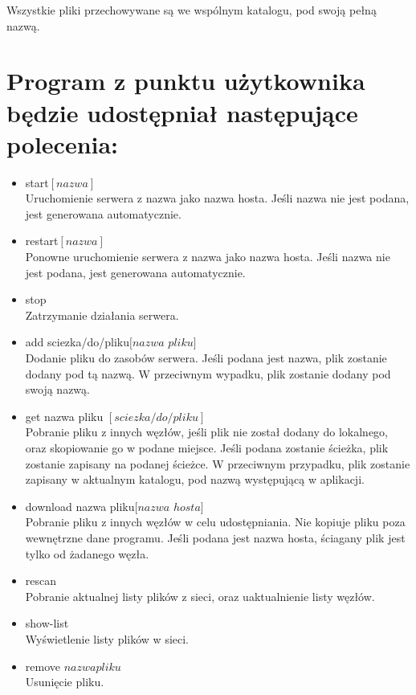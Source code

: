 \documentclass[10pt,a4paper]{article}
\begin{document}
Wszystkie pliki przechowywane są we wspólnym katalogu, pod swoją pełną nazwą.



\section{Program z punktu użytkownika będzie udostępniał następujące polecenia:}
\begin{itemize}
\item start$[nazwa]$\\
Uruchomienie serwera z nazwa jako nazwa hosta. Jeśli nazwa nie jest podana, jest generowana automatycznie.
\item restart$[nazwa]$\\
Ponowne uruchomienie serwera z nazwa jako nazwa hosta. Jeśli nazwa nie jest podana, jest generowana automatycznie.

\item stop\\
Zatrzymanie działania serwera.

\item add sciezka/do/pliku$[nazwa$ $pliku]$\\
Dodanie pliku do zasobów serwera. Jeśli podana jest nazwa, plik zostanie dodany pod tą nazwą. W przeciwnym wypadku, plik zostanie dodany pod swoją nazwą.

\item get nazwa pliku $[sciezka/do/pliku]$\\
Pobranie pliku z innych węzłów, jeśli plik nie został dodany do lokalnego,
oraz skopiowanie go w podane miejsce. Jeśli podana zostanie ścieżka,
plik zostanie zapisany na podanej ścieżce. W przeciwnym przypadku,
plik zostanie zapisany w aktualnym katalogu, pod nazwą występującą w aplikacji.
\item download nazwa pliku$[nazwa$ $hosta]$\\
Pobranie pliku z innych węzłów w celu udostępniania. Nie kopiuje pliku poza wewnętrzne dane programu. Jeśli podana jest nazwa hosta, ściagany plik jest tylko od żadanego węzła.

\item rescan\\
Pobranie aktualnej listy plików z sieci, oraz uaktualnienie listy węzłów.

\item show-list\\
Wyświetlenie listy plików w sieci.
\item remove $nazwa$$pliku$\\
Usunięcie pliku.
\end{itemize}
\end{document}
